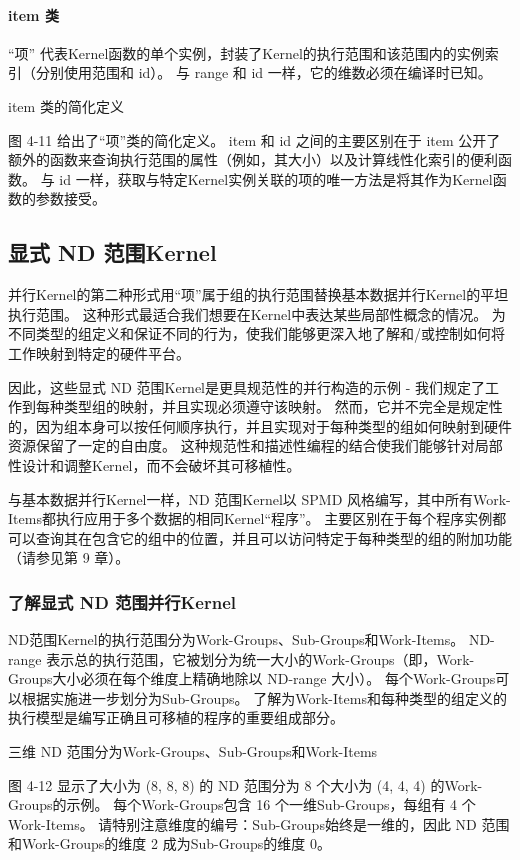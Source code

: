 \paragraph{item 类}

“项” 代表Kernel函数的单个实例，封装了Kernel的执行范围和该范围内的实例索引（分别使用范围和 id）。 
与 range 和 id 一样，它的维数必须在编译时已知。

{\color{red} item 类的简化定义}

图 4-11 给出了“项”类的简化定义。 
item 和 id 之间的主要区别在于 item 公开了额外的函数来查询执行范围的属性（例如，其大小）以及计算线性化索引的便利函数。 
与 id 一样，获取与特定Kernel实例关联的项的唯一方法是将其作为Kernel函数的参数接受。

\subsection{显式 ND 范围Kernel}
并行Kernel的第二种形式用“项”属于组的执行范围替换基本数据并行Kernel的平坦执行范围。 
这种形式最适合我们想要在Kernel中表达某些局部性概念的情况。 
为不同类型的组定义和保证不同的行为，使我们能够更深入地了解和/或控制如何将工作映射到特定的硬件平台。

因此，这些显式 ND 范围Kernel是更具规范性的并行构造的示例 - 我们规定了工作到每种类型组的映射，并且实现必须遵守该映射。 
然而，它并不完全是规定性的，因为组本身可以按任何顺序执行，并且实现对于每种类型的组如何映射到硬件资源保留了一定的自由度。 
这种规范性和描述性编程的结合使我们能够针对局部性设计和调整Kernel，而不会破坏其可移植性。

与基本数据并行Kernel一样，ND 范围Kernel以 SPMD 风格编写，其中所有Work-Items都执行应用于多个数据的相同Kernel“程序”。 
主要区别在于每个程序实例都可以查询其在包含它的组中的位置，并且可以访问特定于每种类型的组的附加功能（请参见第 9 章）。

\subsubsection{了解显式 ND 范围并行Kernel}
ND范围Kernel的执行范围分为Work-Groups、Sub-Groups和Work-Items。 
ND-range 表示总的执行范围，它被划分为统一大小的Work-Groups（即，Work-Groups大小必须在每个维度上精确地除以 ND-range 大小）。 
每个Work-Groups可以根据实施进一步划分为Sub-Groups。 
了解为Work-Items和每种类型的组定义的执行模型是编写正确且可移植的程序的重要组成部分。

{\color{red} 三维 ND 范围分为Work-Groups、Sub-Groups和Work-Items}

图 4-12 显示了大小为 (8, 8, 8) 的 ND 范围分为 8 个大小为 (4, 4, 4) 的Work-Groups的示例。 
每个Work-Groups包含 16 个一维Sub-Groups，每组有 4 个Work-Items。 
请特别注意维度的编号：Sub-Groups始终是一维的，因此 ND 范围和Work-Groups的维度 2 成为Sub-Groups的维度 0。

